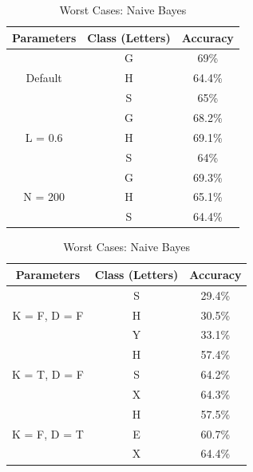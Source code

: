 \documentclass[11pt]{article}
\begin{document}
\begin{table}[!htb]

\centering
\begin{minipage}{0.46\columnwidth}
\begin{tabular}{c  c  c} \hline

Parameters & Class (Letters) & Accuracy \\\hline
\multirow{3}{*}{Default} & G & 69\% \\
	& H & 64.4\% \\
	& S & 65\% \\\hline
\multirow{3}{*}{L = 0.6} & G & 68.2\% \\
	& H & 69.1\% \\
	& S & 64\% \\\hline
\multirow{3}{*}{N = 200} & G & 69.3\% \\
	& H & 65.1\% \\
	& S & 64.4\% \\\hline
\end{tabular}
\caption{Worst Cases: Multilayer Perceptron} %
\label{tbl:ann}
\end{minipage}
\hfill
\begin{minipage}{0.46\columnwidth}
\begin{tabular}{c  c  c} \hline

Parameters & Class (Letters) & Accuracy \\\hline
\multirow{3}{*}{K = F, D = F} & S & 29.4\% \\
	& H & 30.5\% \\
	& Y & 33.1\% \\\hline
\multirow{3}{*}{K = T, D = F} & H & 57.4\% \\
	& S & 64.2\% \\
	& X & 64.3\% \\\hline
\multirow{3}{*}{K = F, D = T} & H & 57.5\% \\
	& E & 60.7\% \\
	& X & 64.4\% \\\hline
\end{tabular}
\caption{Worst Cases: Naive Bayes} %
\label{tbl:bayes}
\end{minipage}
\end{table}
\end{document}
